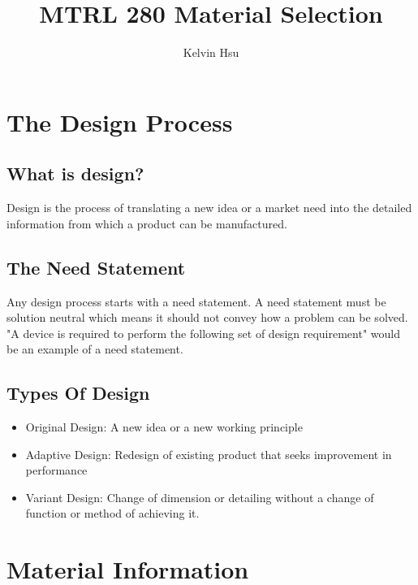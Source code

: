 \documentclass{article}
\title{MTRL 280 Material Selection}
\author{Kelvin Hsu}
\begin{document}
    \sffamily
   	\maketitle
    \newpage

    \section*{The Design Process}
    \subsection*{What is design?}
    Design is the process of translating a new idea or a market need into the 
    detailed information from which a product can
    be manufactured.

    \subsection*{The Need Statement}
    Any design process starts with a need statement. A need statement must be solution neutral which 
    means it should not convey how a problem can be solved. "A device is required to perform the following set of design requirement" would be 
    an example of a need statement.

    \subsection*{Types Of Design}
        \begin{itemize}
            \item Original Design: A new idea or a new working principle
            \item Adaptive Design: Redesign of existing product that seeks improvement in performance
            \item Variant Design: Change of dimension or detailing without a change of 
            function or method of achieving it.
        \end{itemize}


    \section*{Material Information}
\end{document}
